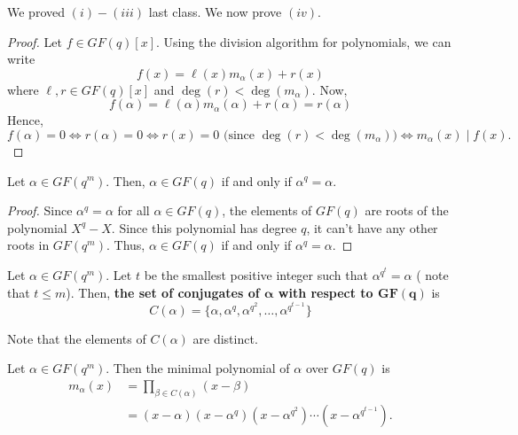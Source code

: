 We proved $ (i)-(iii) $ last class. We now prove $ (iv) $.
\begin{proof}
    Let $ f\in GF(q)[x] $. Using the division algorithm for polynomials,
    we can write
    \[ f(x)=\ell(x)m_\alpha(x)+r(x) \]
    where $ \ell,r\in GF(q)[x] $ and $ \deg(r)<\deg(m_\alpha) $. Now,
    \[ f(\alpha)=\ell(\alpha)m_\alpha(\alpha)+r(\alpha)=r(\alpha) \]
    Hence,
    \[ f(\alpha)=0\iff r(\alpha)=0\iff r(x)=0 \text{ (since }\deg(r)<\deg(m_\alpha)\text{)}\iff
        m_\alpha(x)\mid f(x). \]
\end{proof}

\begin{thmbox}
    \begin{theorem}
        Let $ \alpha\in GF(q^m) $. Then, $ \alpha\in GF(q) $ if and only if
        $ \alpha^q=\alpha $.
    \end{theorem}
\end{thmbox}

\begin{proof}
    Since $ \alpha^q=\alpha $ for all $ \alpha\in GF(q) $, the elements of $ GF(q) $
    are roots of the polynomial $ X^q-X $. Since this polynomial has degree $ q $,
    it can't have any other roots in $ GF(q^m) $. Thus, $ \alpha\in GF(q) $
    if and only if $ \alpha^q=\alpha $.
\end{proof}

\begin{defbox}
    \begin{definition}
        Let $ \alpha\in GF(q^m) $. Let $ t $ be the smallest positive integer such that
        $ \alpha^{q^t}=\alpha $ ( note that $ t\leqslant m $). Then,
        \textbf{the set of conjugates of $ \bm{\alpha} $ with respect to $ \bm{GF(q)} $} is
        \[ C(\alpha)=\{\alpha,\alpha^q,\alpha^{q^2},\ldots,\alpha^{q^{t-1}}\} \]

        Note that the elements of $ C(\alpha) $ are distinct.
    \end{definition}
\end{defbox}

\begin{thmbox}
    \begin{theorem}
        Let $ \alpha\in GF(q^m) $. Then the minimal polynomial of $ \alpha $ over
        $ GF(q) $ is
        \begin{align*}
            m_\alpha(x)
             & =\prod_{\beta\in C(\alpha)}(x-\beta)                               \\
             & =(x-\alpha)(x-\alpha^q)(x-\alpha^{q^2})\cdots(x-\alpha^{q^{t-1}}).
        \end{align*}
    \end{theorem}
\end{thmbox}

